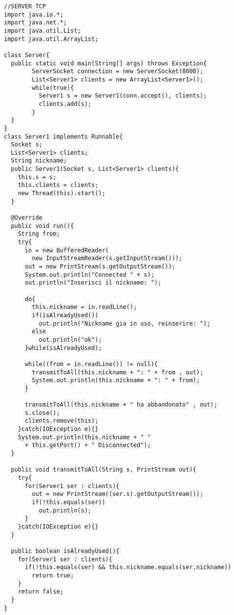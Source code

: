 \documentclass[a4paper, titlepage]{article}
\begin{document}
	\begin{lstlisting}
//SERVER TCP
import java.io.*;
import java.net.*;
import java.util.List;
import java.util.ArrayList;

class Server{
  public static void main(String[] args) throws Exception{
    	ServerSocket connection = new ServerSocket(8000);
    	List<Server1> clients = new ArrayList<Server1>();
    	while(true){
    	  Server1 s = new Server1(conn.accept(), clients);
    	  clients.add(s);
    	}
  }
}
class Server1 implements Runnable{
  Socket s;
  List<Server1> clients;
  String nickname;
  public Server1(Socket s, List<Server1> clients){
    this.s = s;
    this.clients = clients;
    new Thread(this).start();
  }
  
  @Override
  public void run(){
  	String from;
  	try{
  	  in = new BufferedReader(
  	    new InputStreamReader(s.getInputStream()));
  	  out = new PrintStream(s.getOutputStream());
  	  System.out.println("Connected " + s);
  	  out.println("Inserisci il nickname: ");
  	  
  	  do{
  	    this.nickname = in.readLine();
  	    if(isAlreadyUsed())
  	      out.println("Nickname gia in uso, reinserire: ");
  	    else
  	      out.println("ok");
  	  }while(isAlreadyUsed);
  	  
  	  while((from = in.readLine()) != null){
  	    transmitToAll(this.nickname + ": " + from , out);
  	    System.out.println(this.nickname + ": " + from);
  	  }
  	  
  	  transmitToAll(this.nickname + " ha abbandonato" , out);
  	  s.close();
  	  clients.remove(this);
  	}catch(IOException e){}
  	System.out.println(this.nickname + " " 
  	  + this.getPort() + " Disconnected");
  }
  
  public void transmitToAll(String s, PrintStream out){
    try{
      for(Server1 ser : clients){
        out = new PrintStream((ser.s).getOutputStream());
        if(!this.equals(ser))
          out.println(s);
      }
    }catch(IOException e){}
  }
  
  public boolean isAlreadyUsed(){
    for(Server1 ser : clients){
      if(!this.equals(ser) && this.nickname.equals(ser.nickname))
        return true;
    }
    return false;
  }
}
      
  
	\end{lstlisting}
\restoregeometry
\end{document}
